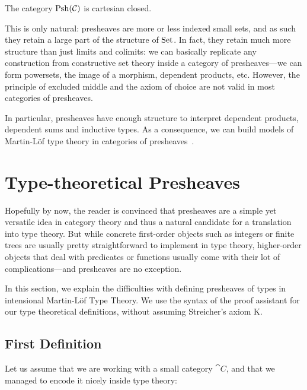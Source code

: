 \begin{theorem}
    The category \( \mathrm{Psh}(\mathcal{C}) \) is cartesian closed.
\end{theorem}

This is only natural: presheaves are more or less indexed small sets, and as 
such they retain a large part of the structure of \( \mathrm{Set} \). In fact, they
retain much more structure than just limits and colimits: we can basically 
% 
% 
replicate any construction from constructive set theory inside a category of 
presheaves---we can form powersets, the image of a morphism, dependent 
products, etc. However, the principle of excluded middle and the axiom of 
choice are not valid in most categories of presheaves.

In particular, presheaves have enough structure to interpret 
dependent products, dependent sums and inductive types. As a consequence, we
can build models of Martin-Löf type theory in categories of 
presheaves~.

\section{Type-theoretical Presheaves}
\label{sec:intensional-problems}

Hopefully by now, the reader is convinced that presheaves are a simple yet 
versatile idea in category theory and thus a natural candidate for a 
translation into type theory.
% 
But while concrete first-order objects such as integers or finite trees 
are usually pretty straightforward to implement in type theory, higher-order objects 
that deal with predicates or functions usually come with their lot of 
complications---and presheaves are no exception.

In this section, we explain the difficulties with defining presheaves of types
in intensional Martin-Löf Type Theory. 
% 
We use the syntax of the \Agda proof assistant for our type theoretical 
definitions, without assuming Streicher's axiom K.

\subsection{First Definition}

Let us assume that we are working with a small category \( \cat{C} \), and that we
managed to encode it nicely inside type theory:

